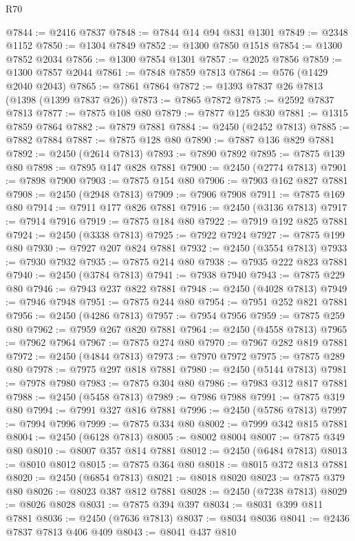 \begin{lexlean}{R70}
\begin{coremodule}
@7844 := @2416 @7837
@7848 := @7844 @14 @94 @831 @1301
@7849 := @2348 @1152
@7850 := @1304 @7849
@7852 := @1300 @7850 @1518
@7854 := @1300 @7852 @2034
@7856 := @1300 @7854 @1301
@7857 := @2025 @7856
@7859 := @1300 @7857 @2044
@7861 := @7848 @7859 @7813
@7864 := @576 (@1429 @2040 @2043)
@7865 := @7861 @7864
@7872 := @1393 @7837 @26 @7813 (@1398 (@1399 @7837 @26))
@7873 := @7865 @7872
@7875 := @2592 @7837 @7813
@7877 := @7875 @108 @80
@7879 := @7877 @125 @830
@7881 := @1315 @7859 @7864
@7882 := @7879 @7881
@7884 := @2450 (@2452 @7813)
@7885 := @7882 @7884
@7887 := @7875 @128 @80
@7890 := @7887 @136 @829 @7881
@7892 := @2450 (@2614 @7813)
@7893 := @7890 @7892
@7895 := @7875 @139 @80
@7898 := @7895 @147 @828 @7881
@7900 := @2450 (@2774 @7813)
@7901 := @7898 @7900
@7903 := @7875 @154 @80
@7906 := @7903 @162 @827 @7881
@7908 := @2450 (@2948 @7813)
@7909 := @7906 @7908
@7911 := @7875 @169 @80
@7914 := @7911 @177 @826 @7881
@7916 := @2450 (@3136 @7813)
@7917 := @7914 @7916
@7919 := @7875 @184 @80
@7922 := @7919 @192 @825 @7881
@7924 := @2450 (@3338 @7813)
@7925 := @7922 @7924
@7927 := @7875 @199 @80
@7930 := @7927 @207 @824 @7881
@7932 := @2450 (@3554 @7813)
@7933 := @7930 @7932
@7935 := @7875 @214 @80
@7938 := @7935 @222 @823 @7881
@7940 := @2450 (@3784 @7813)
@7941 := @7938 @7940
@7943 := @7875 @229 @80
@7946 := @7943 @237 @822 @7881
@7948 := @2450 (@4028 @7813)
@7949 := @7946 @7948
@7951 := @7875 @244 @80
@7954 := @7951 @252 @821 @7881
@7956 := @2450 (@4286 @7813)
@7957 := @7954 @7956
@7959 := @7875 @259 @80
@7962 := @7959 @267 @820 @7881
@7964 := @2450 (@4558 @7813)
@7965 := @7962 @7964
@7967 := @7875 @274 @80
@7970 := @7967 @282 @819 @7881
@7972 := @2450 (@4844 @7813)
@7973 := @7970 @7972
@7975 := @7875 @289 @80
@7978 := @7975 @297 @818 @7881
@7980 := @2450 (@5144 @7813)
@7981 := @7978 @7980
@7983 := @7875 @304 @80
@7986 := @7983 @312 @817 @7881
@7988 := @2450 (@5458 @7813)
@7989 := @7986 @7988
@7991 := @7875 @319 @80
@7994 := @7991 @327 @816 @7881
@7996 := @2450 (@5786 @7813)
@7997 := @7994 @7996
@7999 := @7875 @334 @80
@8002 := @7999 @342 @815 @7881
@8004 := @2450 (@6128 @7813)
@8005 := @8002 @8004
@8007 := @7875 @349 @80
@8010 := @8007 @357 @814 @7881
@8012 := @2450 (@6484 @7813)
@8013 := @8010 @8012
@8015 := @7875 @364 @80
@8018 := @8015 @372 @813 @7881
@8020 := @2450 (@6854 @7813)
@8021 := @8018 @8020
@8023 := @7875 @379 @80
@8026 := @8023 @387 @812 @7881
@8028 := @2450 (@7238 @7813)
@8029 := @8026 @8028
@8031 := @7875 @394 @397
@8034 := @8031 @399 @811 @7881
@8036 := @2450 (@7636 @7813)
@8037 := @8034 @8036
@8041 := @2436 @7837 @7813 @406 @409
@8043 := @8041 @437 @810

\end{coremodule}
\end{lexlean}
